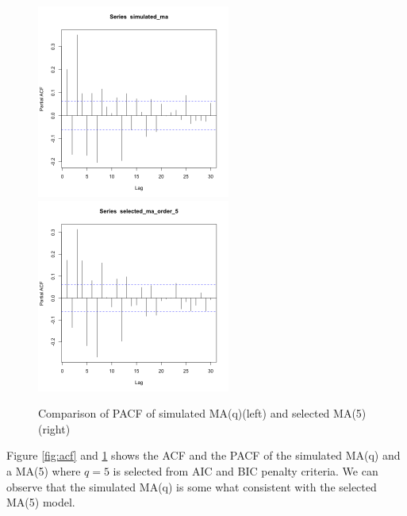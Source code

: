 \documentclass[11pt, oneside]{article}   	%
\begin{document}
\begin{figure}[H] %
   \centering
   \includegraphics[width=2.5in]{pacf-simulated-ma} 
   \includegraphics[width=2.5in]{pacf-selected-ma} 
   \caption{Comparison of PACF of simulated MA(q)(left) and selected MA(5) (right)}
   \label{fig:pacf}
\end{figure}
\justify
Figure \ref{fig:acf} and \ref{fig:pacf} shows the ACF and the PACF of the simulated MA(q) and a MA(5) where $q=5$ is selected from AIC and BIC penalty criteria.
We can observe that the simulated MA(q) is some what consistent with the selected MA(5) model.
\end{document}
